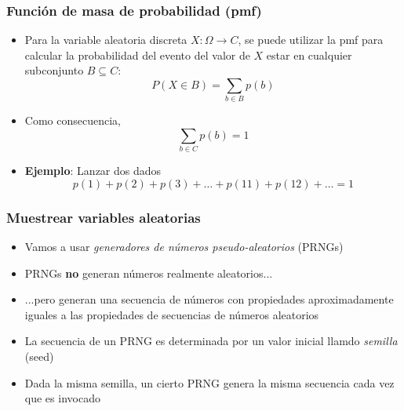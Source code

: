 \documentclass[xcolor=dvipsnames,10pt]{beamer}
\begin{document}
%
\begin{frame}
  \frametitle{Función de masa de probabilidad (pmf)}
  \begin{itemize}
  \item Para la variable aleatoria discreta $X \colon \Omega \to C$, se puede utilizar la pmf para calcular la probabilidad del evento del valor de $X$ estar en cualquier subconjunto $B \subseteq C$:
    \begin{equation*}
      P(X \in B) = \sum_{b \in B} p(b)
    \end{equation*}
    \pause
  \item Como consecuencia,
    \begin{equation*}
      \sum_{b \in C} p(b) = 1
    \end{equation*}
  \item \textbf{Ejemplo}: Lanzar dos dados
    \begin{equation*}
      p(1) + p(2) + p(3) + \dots + p(11) + p(12) + \dots = 1
    \end{equation*}
  \end{itemize}
\end{frame}
%
\begin{frame}
  \frametitle{Muestrear variables aleatorias}
  \begin{itemize}
  \item Vamos a usar \emph{generadores de números pseudo-aleatorios} (PRNGs)
  \item PRNGs \textbf{no} generan números realmente aleatorios...
  \item ...pero generan una secuencia de números con propiedades aproximadamente iguales a las propiedades de secuencias de números aleatorios
  \item La secuencia de un PRNG es determinada por un valor inicial llamdo \emph{semilla} (seed)
  \item Dada la misma semilla, un cierto PRNG genera la misma secuencia cada vez que es invocado
  \end{itemize}
\end{frame}
%
\end{document}
